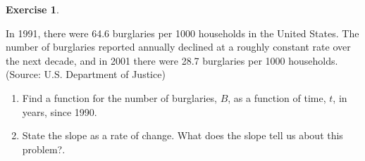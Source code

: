 \documentclass[10pt,]{book}
\theoremstyle{plain}
\theoremstyle{definition}
\theoremstyle{definition}
\theoremstyle{definition}
\theoremstyle{definition}
\theoremstyle{definition}
\newtheorem{exercise}[theorem]{Exercise}
\numberwithin{equation}{section}
\begin{document}
\begin{exercise}\label{exercise-burglaries}

In 1991, there were 64.6 burglaries per 1000 households in the United States. The number of burglaries reported annually declined at a roughly constant rate over the next decade, and in 2001 there were 28.7 burglaries per 1000 households. (Source: U.S. Department of Justice)
\leavevmode%
\begin{enumerate}[label=*\alph**]
\item\hypertarget{li-183}{}Find a function for the number of burglaries, \(B\), as a function of time, \(t\), in years, since 1990.
    \item\hypertarget{li-184}{}State the slope as a rate of change. What does the slope tell us about this problem?.
    \end{enumerate}
\end{exercise}
\typeout{************************************************}
\typeout{************************************************}
\end{document}
